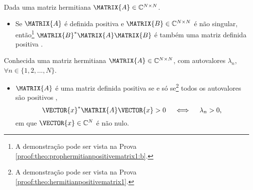 \begin{theorem}\label{theo:prophermitianpositivematrix1}
Dada uma matriz hermitiana $\MATRIX{A} \in \mathbb{C}^{N \times N}$.
\begin{itemize}
\item Se $\MATRIX{A}$ é definida positiva e 
$\MATRIX{B} \in \mathbb{C}^{N \times N}$ é não singular, então\footnote{A
demonstração pode ser vista na Prova \ref{proof:theo:prophermitianpositivematrix1:b}.} 
$\MATRIX{B}^{\ast}\MATRIX{A}\MATRIX{B}$ é também uma matriz definida positiva \cite[pp. 64]{ipsen2009numerical}.
\end{itemize}
\end{theorem}

\begin{theorem}\label{theo:hermitianpositivematrix1}
Conhecida uma matriz hermitiana $\MATRIX{A} \in \mathbb{C}^{N \times N}$, com  autovalores $\lambda_n$,
$\forall n \in \{1, 2, ..., N\}$.
\begin{itemize}
\item $\MATRIX{A}$ é uma matriz definida positiva se e só se\footnote{A
demonstração pode ser vista na Prova \ref{proof:theo:hermitianpositivematrix1}.}  
todos os autovalores são positivos \cite[pp. 309]{hartfiel2000matrix},
\begin{equation}
\VECTOR{x}^{\ast} \MATRIX{A} \VECTOR{x} > 0 \quad \iff \quad \lambda_n > 0,
\end{equation}
em que $\VECTOR{x} \in \mathbb{C}^{N}$ é não nulo.
\end{itemize}
\end{theorem}
